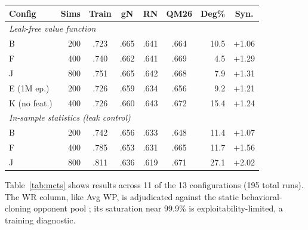 \documentclass[journal]{IEEEtran}
\providecommand{\DIFdeltex}[1]{{\protect\color{red} \scriptsize #1}} %
\providecommand{\DIFaddbegin}{} %
\providecommand{\DIFaddend}{} %
\providecommand{\DIFdelbegin}{} %
\providecommand{\DIFdelend}{} %
\providecommand{\DIFdel}[1]{\texorpdfstring{\DIFdeltex{#1}}{}} %
\begin{document}
\begin{table}[t]
\DIFdelend \DIFaddbegin \setlength{\tabcolsep}{2.8pt}
\small
\begin{tabular}{lrccccrc}
\toprule
Config & Sims & Train & gN & RN & QM26 & Deg\% & Syn. \\
\midrule
\multicolumn{8}{l}{\textit{Leak-free value function}} \\
B & 200 & .723 & .665 & .641 & .664 & 10.5 & +1.06 \\
F & 400 & .740 & .662 & .641 & .669 & 4.5 & +1.29 \\
J & 800 & .751 & .665 & .642 & .668 & 7.9 & +1.31 \\
E (1M ep.) & 200 & .726 & .659 & .634 & .656 & 9.2 & +1.21 \\
K (no feat.) & 400 & .726 & .660 & .643 & .672 & 15.4 & +1.24 \\
\midrule
\multicolumn{8}{l}{\textit{In-sample statistics (leak control)}} \\
B & 200 & .742 & .656 & .633 & .648 & 11.4 & +1.07 \\
F & 400 & .785 & .653 & .631 & .665 & 11.7 & +1.56 \\
J & 800 & .811 & .636 & .619 & .671 & 27.1 & +2.02 \\
\bottomrule
\end{tabular}
\end{table}
\DIFaddend 

\DIFdelbegin \DIFdel{Table~\ref{tab:mcts} shows results across 11 of the 13 configurations (195 total runs). The WR column, like Avg WP, is adjudicated against the static behavioral-cloning opponent pool ; its saturation near 99.9\% is exploitability-limited, a training diagnostic. }%
\end{document}

